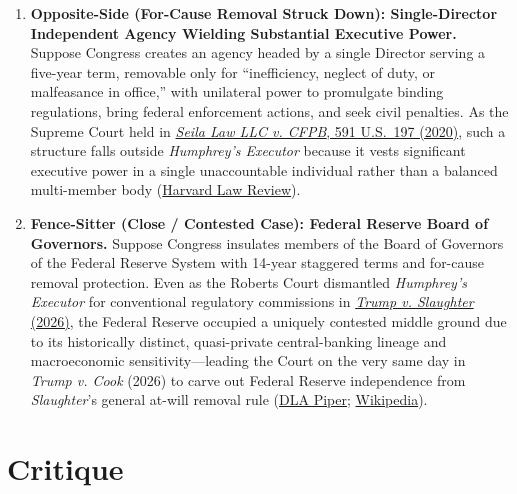 \documentclass[12pt]{article}
\begin{document}
\begin{enumerate}
    \item \textbf{Opposite-Side (For-Cause Removal Struck Down): Single-Director Independent Agency Wielding Substantial Executive Power.} Suppose Congress creates an agency headed by a single Director serving a five-year term, removable only for ``inefficiency, neglect of duty, or malfeasance in office,'' with unilateral power to promulgate binding regulations, bring federal enforcement actions, and seek civil penalties. As the Supreme Court held in \href{https://www.supremecourt.gov/opinions/19pdf/19-7_n6io.pdf}{\textit{Seila Law LLC v. CFPB}, 591 U.S.\ 197 (2020)}, such a structure falls outside \textit{Humphrey's Executor} because it vests significant executive power in a single unaccountable individual rather than a balanced multi-member body (\href{https://harvardlawreview.org/print/vol-137/the-presumption-against-novelty-in-the-roberts-courts-separation-of-powers-case-law/}{Harvard Law Review}).

    \item \textbf{Fence-Sitter (Close / Contested Case): Federal Reserve Board of Governors.} Suppose Congress insulates members of the Board of Governors of the Federal Reserve System with 14-year staggered terms and for-cause removal protection. Even as the Roberts Court dismantled \textit{Humphrey's Executor} for conventional regulatory commissions in \href{https://supreme.justia.com/cases/federal/us/609/25-332/}{\textit{Trump v. Slaughter} (2026)}, the Federal Reserve occupied a uniquely contested middle ground due to its historically distinct, quasi-private central-banking lineage and macroeconomic sensitivity---leading the Court on the very same day in \textit{Trump v. Cook} (2026) to carve out Federal Reserve independence from \textit{Slaughter}'s general at-will removal rule (\href{https://www.dlapiper.com/en/insights/publications/2026/07/supreme-court-overrules-humphreys-executor-upholds-federal-reserve-independence}{DLA Piper}; \href{https://en.wikipedia.org/wiki/Trump_v._Slaughter}{Wikipedia}).
\end{enumerate}

\section{Critique}
\end{document}
